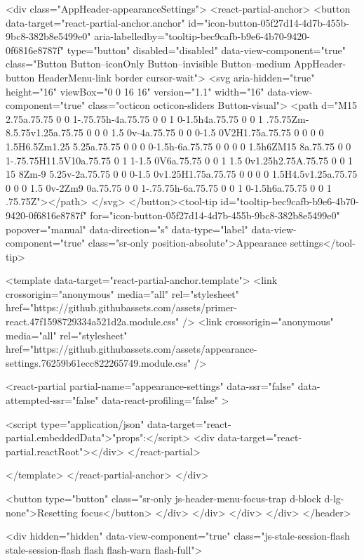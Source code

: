                 <div class="AppHeader-appearanceSettings">
    <react-partial-anchor>
      <button data-target="react-partial-anchor.anchor" id="icon-button-05f27d14-4d7b-455b-9bc8-382b8e5499e0" aria-labelledby="tooltip-bec9cafb-b9e6-4b70-9420-0f6816e8787f" type="button" disabled="disabled" data-view-component="true" class="Button Button--iconOnly Button--invisible Button--medium AppHeader-button HeaderMenu-link border cursor-wait">  <svg aria-hidden="true" height="16" viewBox="0 0 16 16" version="1.1" width="16" data-view-component="true" class="octicon octicon-sliders Button-visual">
    <path d="M15 2.75a.75.75 0 0 1-.75.75h-4a.75.75 0 0 1 0-1.5h4a.75.75 0 0 1 .75.75Zm-8.5.75v1.25a.75.75 0 0 0 1.5 0v-4a.75.75 0 0 0-1.5 0V2H1.75a.75.75 0 0 0 0 1.5H6.5Zm1.25 5.25a.75.75 0 0 0 0-1.5h-6a.75.75 0 0 0 0 1.5h6ZM15 8a.75.75 0 0 1-.75.75H11.5V10a.75.75 0 1 1-1.5 0V6a.75.75 0 0 1 1.5 0v1.25h2.75A.75.75 0 0 1 15 8Zm-9 5.25v-2a.75.75 0 0 0-1.5 0v1.25H1.75a.75.75 0 0 0 0 1.5H4.5v1.25a.75.75 0 0 0 1.5 0v-2Zm9 0a.75.75 0 0 1-.75.75h-6a.75.75 0 0 1 0-1.5h6a.75.75 0 0 1 .75.75Z"></path>
</svg>
</button><tool-tip id="tooltip-bec9cafb-b9e6-4b70-9420-0f6816e8787f" for="icon-button-05f27d14-4d7b-455b-9bc8-382b8e5499e0" popover="manual" data-direction="s" data-type="label" data-view-component="true" class="sr-only position-absolute">Appearance settings</tool-tip>

      <template data-target="react-partial-anchor.template">
        <link crossorigin="anonymous" media="all" rel="stylesheet" href="https://github.githubassets.com/assets/primer-react.47f1598729334a521d2a.module.css" />
<link crossorigin="anonymous" media="all" rel="stylesheet" href="https://github.githubassets.com/assets/appearance-settings.76259b61ecc822265749.module.css" />

<react-partial
  partial-name="appearance-settings"
  data-ssr="false"
  data-attempted-ssr="false"
  data-react-profiling="false"
>
  
  <script type="application/json" data-target="react-partial.embeddedData">{"props":{}}</script>
  <div data-target="react-partial.reactRoot"></div>
</react-partial>

      </template>
    </react-partial-anchor>
  </div>

          <button type="button" class="sr-only js-header-menu-focus-trap d-block d-lg-none">Resetting focus</button>
        </div>
      </div>
    </div>
  </div>
</header>

      <div hidden="hidden" data-view-component="true" class="js-stale-session-flash stale-session-flash flash flash-warn flash-full">
  
